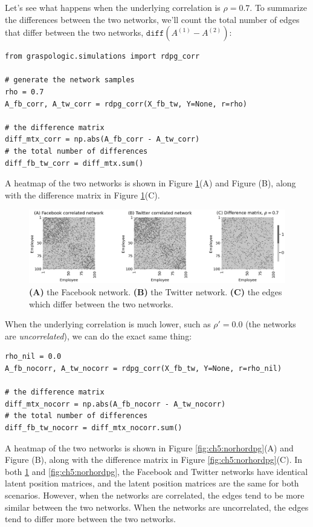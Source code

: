 Let's see what happens when the underlying correlation is $\rho = 0.7$. To summarize the differences between the two networks, we'll count the total number of edges that differ between the two networks, $\texttt{diff}\left(A^{(1)} - A^{(2)}\right)$:

\begin{lstlisting}[style=python]
from graspologic.simulations import rdpg_corr

# generate the network samples
rho = 0.7
A_fb_corr, A_tw_corr = rdpg_corr(X_fb_tw, Y=None, r=rho)

# the difference matrix
diff_mtx_corr = np.abs(A_fb_corr - A_tw_corr)
# the total number of differences
diff_fb_tw_corr = diff_mtx.sum()
\end{lstlisting}

A heatmap of the two networks is shown in Figure \ref{fig:ch5:rhordpg}(A) and Figure (B), along with the difference matrix in Figure \ref{fig:ch5:rhordpg}(C).

\begin{figure}
    \centering
    \includegraphics[width=\linewidth]{representations/ch5/Images/rhordpg.png}
    \caption[$\rho$-correlated RDPGs]{\textbf{(A)} the Facebook network. \textbf{(B)} the Twitter network. \textbf{(C)} the edges which differ between the two networks.}
    \label{fig:ch5:rhordpg}
\end{figure}
When the underlying correlation is much lower, such as $\rho' = 0.0$ (the networks are \textit{uncorrelated}), we can do the exact same thing:

\begin{lstlisting}[style=python]
rho_nil = 0.0
A_fb_nocorr, A_tw_nocorr = rdpg_corr(X_fb_tw, Y=None, r=rho_nil)

# the difference matrix
diff_mtx_nocorr = np.abs(A_fb_nocorr - A_tw_nocorr)
# the total number of differences
diff_fb_tw_nocorr = diff_mtx_nocorr.sum()
\end{lstlisting}

A heatmap of the two networks is shown in Figure \ref{fig:ch5:norhordpg}(A) and Figure (B), along with the difference matrix in Figure \ref{fig:ch5:norhordpg}(C). In both \ref{fig:ch5:rhordpg} and \ref{fig:ch5:norhordpg}, the Facebook and Twitter networks have {identical} latent position matrices, and the latent position matrices are the same for both scenarios. However, when the networks are correlated, the edges tend to be more similar between the two networks. When the networks are uncorrelated, the edges tend to differ more between the two networks. 

